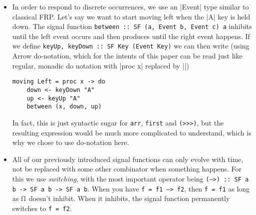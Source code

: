 \documentclass[pdftex,a4paper]{extarticle}
\begin{document}
\begin{itemize}
\item In order to respond to discrete occurrences, we use an |Event| type similar to classical FRP. Let's say we want to start moving left when the |A| key is held down. The signal function \texttt{between :: SF (a, Event b, Event c) a} inhibits until the left event occurs and then produces until the right event happens. If we define \texttt{keyUp, keyDown :: SF Key (Event Key)} we can then write (using Arrow do-notation\cite{ghcdocs-arrownotation}, which for the intents of this paper can be read just like regular, monadic do notation with |proc x| replaced by |\x|)
\begin{verbatim}
moving Left = proc x -> do
    down <- keyDown "A"
    up <- keyUp "A"
    between (x, down, up)
\end{verbatim}
\begin{figure}[ht]
\centering
{}
\end{figure}
In fact, this is just syntactic sugar for \texttt{arr}, \texttt{first} and \texttt{(>>>)}, but the resulting expression would be much more complicated to understand, which is why we chose to use do-notation here.

\item All of our previously introduced signal functions can only evolve with time, not be replaced with some other combinator when something happens. For this we use \emph{switching}, with the most important operator being \texttt{(-->) :: SF a b -> SF a b -> SF a b}.
When you have \texttt{f = f1 --> f2}, then \texttt{f = f1} as long as f1 doesn't inhibit. When it inhibits, the signal function permanently switches to \texttt{f = f2}.


\end{itemize}
\end{document}

